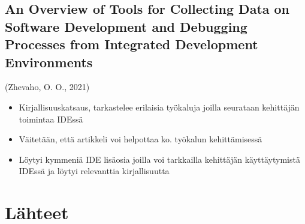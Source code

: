 \documentclass[11pt]{article}
\begin{document}
\subsection{An Overview of Tools for Collecting Data on Software Development and Debugging Processes from Integrated Development Environments}
\label{sec:org1ba6867}
(Zhevaho, O. O., 2021)
\begin{itemize}
\item Kirjallisuuskatsaus, tarkastelee erilaisia työkaluja joilla
seurataan kehittäjän toimintaa IDEssä
\item Väitetään, että artikkeli voi helpottaa ko. työkalun kehittämisessä
\item Löytyi kymmeniä IDE lisäosia joilla voi tarkkailla kehittäjän
käyttäytymistä IDEssä ja löytyi relevanttia kirjallisuutta
\end{itemize}



\section{Lähteet}
\label{sec:orgb7e844c}
\end{document}
